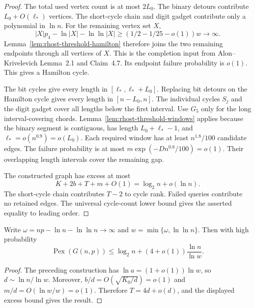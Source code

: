 \begin{proof}
The total used vertex count is at most $2L_0$.
The binary detours contribute $L_0+O(\ell_*)$ vertices.
The short-cycle chain and digit gadget contribute only a polynomial in $\ln n$.
For the remaining vertex set $X$,
\[
 |X|p_4-\ln|X|-\ln\ln|X|
 \ge(1/2-1/25-o(1))w\longrightarrow\infty.
\]
Lemma~\ref{lem:rhost-threshold-hamilton} therefore joins the two remaining endpoints through all vertices of $X$.
This is the completion input from Alon--Krivelevich Lemma~2.1 and Claim~4.7.
Its endpoint failure probability is $o(1)$.
This gives a Hamilton cycle.

The bit cycles give every length in $[\ell_*,\ell_*+L_0]$.
Replacing bit detours on the Hamilton cycle gives every length in $[n-L_0,n]$.
The individual cycles $S_j$ and the digit gadget cover all lengths below the first interval.
Use $G_5$ only for the long interval-covering chords.
Lemma~\ref{lem:rhost-threshold-windows} applies because the binary segment is contiguous, has length $L_0+\ell_*-1$,
and $\ell_*=o(n^{0.9})=o(L_0)$.
Each required window has at least $n^{1.8}/100$ candidate edges.
The failure probability is at most $m\exp(-Dn^{0.8}/100)=o(1)$.
Their overlapping length intervals cover the remaining gap.

The constructed graph has excess at most
\[
 K+2b+T+m+O(1)=\log_2 n+o(\ln n).
\]
The short-cycle chain contributes $T-2$ to cycle rank.
Failed queries contribute no retained edges.
The universal cycle-count lower bound gives the asserted equality to leading order.
\end{proof}

\begin{corollary}\label{cor:rhost-full-threshold-error}
Write $\omega=np-\ln n-\ln\ln n\to\infty$ and $w=\min\{\omega,\ln\ln n\}$.
Then with high probability
\[
 \operatorname{Pex}(G(n,p))
 \le\log_2n+(4+o(1))\frac{\ln n}{\ln w}.
\]
\end{corollary}

\begin{proof}
The preceding construction has $\ln a=(1+o(1))\ln w$, so $d\sim\ln n/\ln w$.
Moreover, $b/d=O(\sqrt{K_0/d})=o(1)$ and $m/d=O(\ln w/w)=o(1)$.
Therefore $T=4d+o(d)$, and the displayed excess bound gives the result.
\end{proof}
